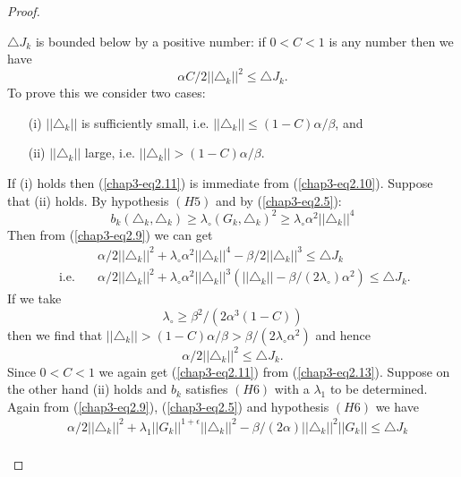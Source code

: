 \begin{proof}
\begin{step}%
 $\triangle J_{k}$ is bounded below by a positive number: if $0 < C < 1$ is any number then we have
\begin{equation*}
\alpha C / 2 ||\triangle_{k}||^{2} \leq \triangle J_{k}.\tag{2.11}\label{chap3-eq2.11}
\end{equation*}
To prove this we consider two cases:
\begin{enumerate}
\item[(i)] $||\triangle_{k}||$ is sufficiently small, i.e. $||\triangle_{k}|| \leq (1-C) \alpha/\beta$, and
\item[(ii)] $||\triangle_{k}||$ large, i.e. $||\triangle_{k}|| > (1-C) \alpha/\beta$.
\end{enumerate}
If (i) holds then (\ref{chap3-eq2.11}) is immediate from
(\ref{chap3-eq2.10}). Suppose that (ii) holds. By hypothesis $(H5)$
and by (\ref{chap3-eq2.5}): 
$$
b_{k}(\triangle_{k}, \triangle_{k}) \geq \lambda_{\circ} (G_{k},
\triangle_{k})^{2} \geq \lambda_{\circ} \alpha^{2}
||\triangle_{k}||^{4} 
$$
Then from (\ref{chap3-eq2.9}) we can get
\begin{align*}
& \alpha / 2 ||\triangle_{k}||^{2} + \lambda_{\circ} \alpha^{2} ||\triangle_{k}||^{4} - \beta / 2 ||\triangle_{k}||^{3} \leq \triangle J_{k}\\ 
\text{ i.e.}\quad & \alpha / 2 ||\triangle_{k}||^{2} + \lambda_{\circ} \alpha^{2} ||\triangle_{k}||^{3} (||\triangle_{k}|| - \beta / (2\lambda_{\circ}) \alpha^{2}) \leq \triangle J_{k}.
\end{align*}
If we take
\begin{equation*}
\lambda_{\circ} \geq \beta^{2} / (2\alpha^{3} (1 - C))\tag{2.12}\label{chap3-eq2.12}
\end{equation*}
then we find that $||\triangle_{k}|| > (1-C) \alpha/ \beta > \beta / (2\lambda_{\circ} \alpha^{2})$ and hence
\begin{equation*}
\alpha / 2 ||\triangle_{k}||^{2} \leq \triangle J_{k}.\tag{2.13}\label{chap3-eq2.13}
\end{equation*}
Since $0 < C < 1$ we again get (\ref{chap3-eq2.11}) from (\ref{chap3-eq2.13}). Suppose on the other hand (ii) holds and $b_{k}$ satisfies $(H6)$ with a $\lambda_{1}$ to be determined. Again from (\ref{chap3-eq2.9}), (\ref{chap3-eq2.5}) and hypothesis $(H6)$ we have
\begin{align*}
& \alpha / 2 ||\triangle_{k}||^{2} + \lambda_{1} ||G_{k}||^{1+\epsilon} ||\triangle_{k}||^{2} - \beta / (2\alpha) ||\triangle_{k}||^{2} ||G_{k}|| \leq \triangle J_{k}\\

\end{align*}
\end{step}
\end{proof}
